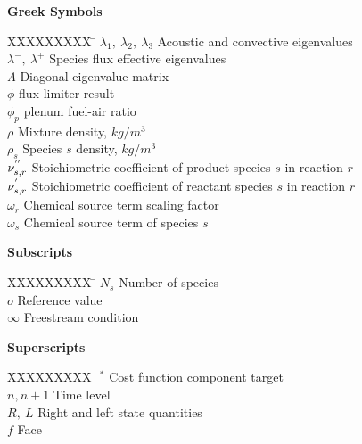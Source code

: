 \textbf{Greek Symbols}
\begin{tabbing}
  XXXXXXXXX \= \kill%
  $\lambda_1,\ \lambda_2,\ \lambda_3$ \> Acoustic and convective eigenvalues \\
  $\lambda^-,\ \lambda^+$ \> Species flux effective eigenvalues \\
  $\Lambda$ \> Diagonal eigenvalue matrix \\
  $\phi$ \> flux limiter result \\
  $\phi_p$ \> plenum fuel-air ratio \\
  $\rho$ \> Mixture density, $kg/m^3$ \\
  $\rho_s$ \> Species $s$ density, $kg/m^3$ \\
  $\nu_{s,r}^{''}$ \> Stoichiometric coefficient of product species $s$ in reaction $r$ \\
  $\nu_{s,r}^{'}$ \> Stoichiometric coefficient of reactant species $s$ in reaction $r$ \\
  $\omega_r$ \> Chemical source term scaling factor \\
  $\omega_s$ \> Chemical source term of species $s$ \\
\end{tabbing}

\textbf{Subscripts}
\begin{tabbing}
  XXXXXXXXX \= \kill%
  $N_s$ \> Number of species \\
  $o$ \> Reference value \\
  $\infty$ \> Freestream condition \\
\end{tabbing}

\textbf{Superscripts}
\begin{tabbing}
  XXXXXXXXX \= \kill%
  $^*$ \> Cost function component target \\
  $n, n+1$ \> Time level \\
  $R,\ L$ \> Right and left state quantities \\
  $f$ \> Face
\end{tabbing}

